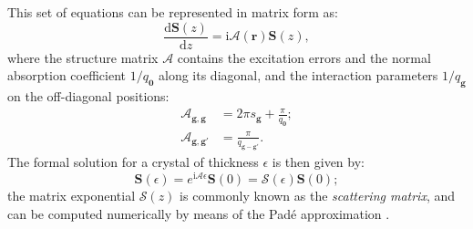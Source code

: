 \documentclass[DIV=calc, paper=letter, fontsize=11pt]{scrartcl}	 %
\begin{document}
{This set of equations can be represented in matrix form as:
\begin{equation}
	\frac{\mathrm{d}\mathbf{S}(z)}{\mathrm{d}z} = \mathrm{i}\mathcal{A}(\mathbf{r})\mathbf{S}(z),\label{eq:matrix}
\end{equation}
where the structure matrix $\mathcal{A}$ contains the excitation errors and the normal absorption coefficient $1/q_{\mathbf{0}}$ 
along its diagonal, and the interaction parameters $1/q_{\mathbf{g}}$ on the off-diagonal positions:
\begin{align*}
    \mathcal{A}_{\mathbf{g},\mathbf{g}} & = 2\pi s_{\mathbf{g}} + \frac{\pi}{q_{\mathbf{0}}};\\
    \mathcal{A}_{\mathbf{g},\mathbf{g}'} & = \frac{\pi}{q_{\mathbf{g}-\mathbf{g}'}}.
\end{align*}
The formal solution for a crystal of thickness $\epsilon$ is then given by:
\begin{equation}
	\mathbf{S}(\epsilon) = e^{\mathrm{i}\mathcal{A}\epsilon}\mathbf{S}(0) = \mathcal{S}(\epsilon)\mathbf{S}(0);
\end{equation}
the matrix exponential $\mathcal{S}(z)$ is commonly known as the \textit{scattering matrix}, and can be computed numerically
by means of the Pad\'e approximation \cite{moler2003a}.

}
\end{document}
